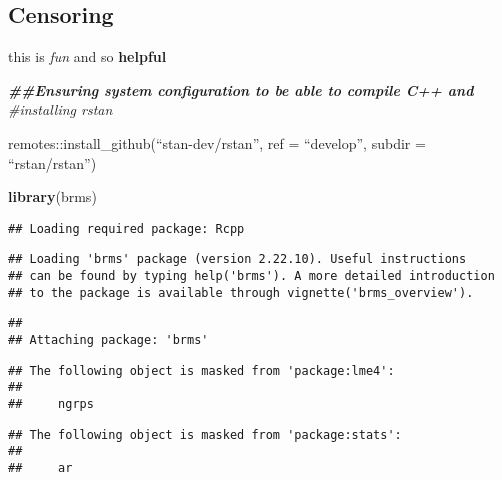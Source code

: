\documentclass[
]{article}
\newenvironment{Shaded}{\begin{snugshade}}{\end{snugshade}}
\newcommand{\CommentTok}[1]{\textcolor[rgb]{0.56,0.35,0.01}{\textit{#1}}}
\newcommand{\DocumentationTok}[1]{\textcolor[rgb]{0.56,0.35,0.01}{\textbf{\textit{#1}}}}
\newcommand{\FunctionTok}[1]{\textcolor[rgb]{0.13,0.29,0.53}{\textbf{#1}}}
\newcommand{\NormalTok}[1]{#1}
\begin{document}
\subsection{Censoring}\label{censoring}

this is \emph{fun} and so \textbf{helpful}

\begin{Shaded}
\begin{Highlighting}[]
\DocumentationTok{\#\#Ensuring system configuration to be able to compile C++ and }
\CommentTok{\#installing rstan}
\end{Highlighting}
\end{Shaded}

remotes::install\_github(``stan-dev/rstan'', ref = ``develop'', subdir =
``rstan/rstan'')

\begin{Shaded}
\begin{Highlighting}[]
\FunctionTok{library}\NormalTok{(brms)}
\end{Highlighting}
\end{Shaded}

\begin{verbatim}
## Loading required package: Rcpp
\end{verbatim}

\begin{verbatim}
## Loading 'brms' package (version 2.22.10). Useful instructions
## can be found by typing help('brms'). A more detailed introduction
## to the package is available through vignette('brms_overview').
\end{verbatim}

\begin{verbatim}
## 
## Attaching package: 'brms'
\end{verbatim}

\begin{verbatim}
## The following object is masked from 'package:lme4':
## 
##     ngrps
\end{verbatim}

\begin{verbatim}
## The following object is masked from 'package:stats':
## 
##     ar
\end{verbatim}
\end{document}
